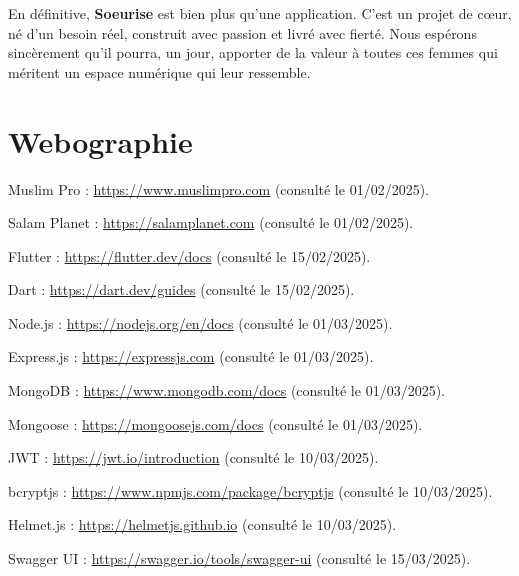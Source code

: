 \documentclass[12pt,a4paper]{report}
\begin{document}
	En définitive, \textbf{Soeurise} est bien plus qu'une application. 
	C'est un projet de cœur, né d'un besoin réel, construit avec passion 
	et livré avec fierté. Nous espérons sincèrement qu'il pourra, un jour, 
	apporter de la valeur à toutes ces femmes qui méritent un espace 
	numérique qui leur ressemble.
	\chapter*{Webographie}
	\thispagestyle{fancy}
	
	\begin{enumerate}[label={[\arabic*]}, leftmargin=1.5cm]
		
		\item Muslim Pro : \url{https://www.muslimpro.com} (consulté le 01/02/2025).
		
		\item Salam Planet : \url{https://salamplanet.com} (consulté le 01/02/2025).
		
		\item Flutter : \url{https://flutter.dev/docs} (consulté le 15/02/2025).
		
		\item Dart : \url{https://dart.dev/guides} (consulté le 15/02/2025).
		
		\item Node.js : \url{https://nodejs.org/en/docs} (consulté le 01/03/2025).
		
		\item Express.js : \url{https://expressjs.com} (consulté le 01/03/2025).
		
		\item MongoDB : \url{https://www.mongodb.com/docs} (consulté le 01/03/2025).
		
		\item Mongoose : \url{https://mongoosejs.com/docs} (consulté le 01/03/2025).
		
		\item JWT : \url{https://jwt.io/introduction} (consulté le 10/03/2025).
		
		\item bcryptjs : \url{https://www.npmjs.com/package/bcryptjs} (consulté le 10/03/2025).
		
		\item Helmet.js : \url{https://helmetjs.github.io} (consulté le 10/03/2025).
		
		\item Swagger UI : \url{https://swagger.io/tools/swagger-ui} (consulté le 15/03/2025).
		

\end{enumerate}
\end{document}
